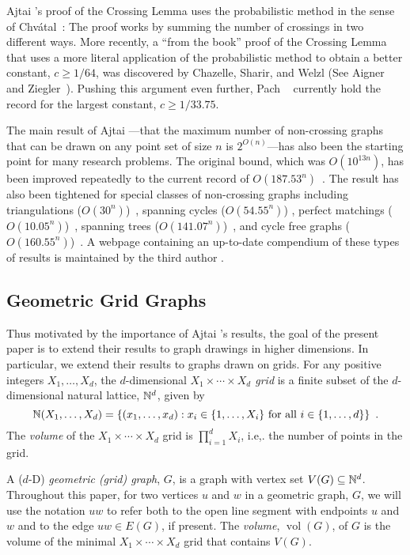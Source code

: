 \documentclass{patmorin}
\DeclareMathOperator{\volume}{vol}
\begin{document}
Ajtai \etal's proof of the Crossing Lemma uses the probabilistic method
in the sense of Chv\'atal~\cite{chvatal:hypergraphs}: The proof works by
summing the number of crossings in two different ways.  More recently, a
``from the book'' proof of the Crossing Lemma that uses a more literal
application of the probabilistic method to obtain a better constant,
$c\ge 1/64$, was discovered by Chazelle, Sharir, and Welzl (See Aigner
and Ziegler~\cite[Chapter~30, Theorem~4]{aigner.ziegler:proofs}).  Pushing
this argument even further, Pach \etal~\cite{pach.radoicic.ea:improving}
currently hold the record for the largest constant, $c\ge 1/33.75$.

The main result of Ajtai \etal---that the maximum number
of non-crossing graphs that can be drawn on any point set of
size $n$ is $2^{O(n)}$---has also been the starting point
for many research problems. The original bound, which was
$O(10^{13n})$, has been improved repeatedly to the current record of
$O(187.53^n)$~\cite{sharir.sheffer:counting*1}.  The result has also
been tightened for special classes of non-crossing graphs including
triangulations ($O(30^n)$)~\cite{sharir.sheffer:counting}, spanning
cycles ($O(54.55^n)$) \cite{sharir.sheffer.ea:counting}, perfect
matchings ($O(10.05^n)$)~\cite{sharir.welzl:on}, spanning trees
($O(141.07^n)$)~\cite{hoffmann.sharir.ea:counting}, and cycle free graphs
($O(160.55^n)$)~\cite{hoffmann.sharir.ea:counting,sharir.sheffer:counting}.
A webpage containing an up-to-date compendium of these types of results
is maintained by the third author \cite{sheffer:numbers}.

\subsection{Geometric Grid Graphs}

Thus motivated by the importance of Ajtai \etal's results, the goal
of the present paper is to extend their results to graph drawings in
higher dimensions.  In particular, we extend their results to graphs
drawn on grids.  For any positive integers $X_1,\ldots,X_d$, the
$d$-dimensional \emph{$X_1\times\cdots\times X_d$ grid} is a finite
subset of the $d$-dimensional natural lattice, $\mathbb{N}^d$, given by
\[  \mathbb{N}(X_1,\ldots,X_d) = \{(x_1,\ldots,x_d): 
      \mbox{$x_i\in\{1,\ldots,X_i\}$ for all $i\in\{1,\ldots,d\}$}\}
	\enspace .\]
The \emph{volume} of the $X_1\times\cdots\times X_d$ grid is
$\prod_{i=1}^d X_i$, i.e,. the number of points in the grid.

A ($d$-D) \emph{geometric (grid) graph}, $G$, is a graph with vertex
set $V(G)\subseteq \mathbb{N}^d$.  Throughout this paper, for two vertices $u$
and $w$ in a geometric graph, $G$, we will use the notation $uw$ to
refer both to the open line segment with endpoints $u$ and $w$ and to
the edge $uw\in E(G)$, if present.    The \emph{volume}, $\volume(G)$,
of $G$ is the volume of the minimal $X_1\times\cdots\times X_d$ grid
that contains $V(G)$.
\end{document}
